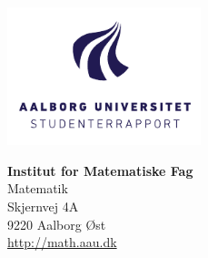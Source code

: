 

{}
\thispagestyle{empty}

\begin{minipage}[t]{0.48\textwidth}
\vspace*{-25pt}			%
\includegraphics[height=4cm]{Formalia/AAU-logo-stud-DK-RGB.pdf}
\end{minipage}
\hfill
\begin{minipage}[t]{0.48\textwidth}
{\small 
\textbf{Institut for Matematiske Fag}\\
Matematik\\
Skjernvej 4A \\
9220 Aalborg Øst \\
\href{http://math.aau.dk}{http://math.aau.dk}}
\end{minipage}

\vspace*{1cm}

